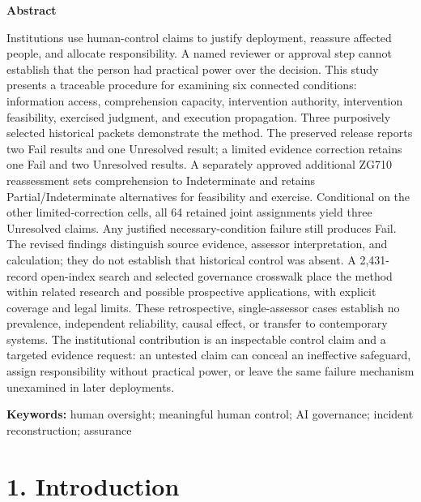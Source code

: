 \documentclass[11pt]{article}
\begin{document}
\begin{TAEAbstractBox}
{\small\textbf{Abstract}\par\medskip}
\small
Institutions use human-control claims to justify deployment, reassure affected people, and allocate responsibility. A named reviewer or approval step cannot establish that the person had practical power over the decision. This study presents a traceable procedure for examining six connected conditions: information access, comprehension capacity, intervention authority, intervention feasibility, exercised judgment, and execution propagation. Three purposively selected historical packets demonstrate the method. The preserved release reports two Fail results and one Unresolved result; a limited evidence correction retains one Fail and two Unresolved results. A separately approved additional ZG710 reassessment sets comprehension to Indeterminate and retains Partial/Indeterminate alternatives for feasibility and exercise. Conditional on the other limited-correction cells, all 64 retained joint assignments yield three Unresolved claims. Any justified necessary-condition failure still produces Fail. The revised findings distinguish source evidence, assessor interpretation, and calculation; they do not establish that historical control was absent. A 2,431-record open-index search and selected governance crosswalk place the method within related research and possible prospective applications, with explicit coverage and legal limits. These retrospective, single-assessor cases establish no prevalence, independent reliability, causal effect, or transfer to contemporary systems. The institutional contribution is an inspectable control claim and a targeted evidence request: an untested claim can conceal an ineffective safeguard, assign responsibility without practical power, or leave the same failure mechanism unexamined in later deployments.

\par\medskip\noindent\textbf{Keywords:} human oversight; meaningful human control; AI governance; incident reconstruction; assurance
\end{TAEAbstractBox}
\medskip

\section*{1. Introduction}
\end{document}
